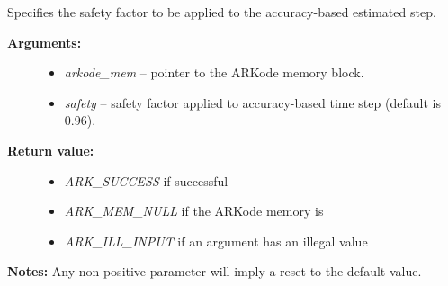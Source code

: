 \documentclass[letterpaper,10pt,english]{sphinxmanual}
\begin{document}
\begin{fulllineitems}
\label{c_interface/User_callable:c.ARKodeSetSafetyFactor}
Specifies the safety factor to be applied to the accuracy-based
estimated step.
\begin{description}
\item[{\textbf{Arguments:}}] \leavevmode\begin{itemize}
\item {} 
\emph{arkode\_mem} -- pointer to the ARKode memory block.

\item {} 
\emph{safety} -- safety factor applied to accuracy-based time step (default is 0.96).

\end{itemize}

\item[{\textbf{Return value:}}] \leavevmode\begin{itemize}
\item {} 
\emph{ARK\_SUCCESS} if successful

\item {} 
\emph{ARK\_MEM\_NULL} if the ARKode memory is 

\item {} 
\emph{ARK\_ILL\_INPUT} if an argument has an illegal value

\end{itemize}

\end{description}

\textbf{Notes:} Any non-positive parameter will imply a reset to the default
value.

\end{fulllineitems}

\end{document}
